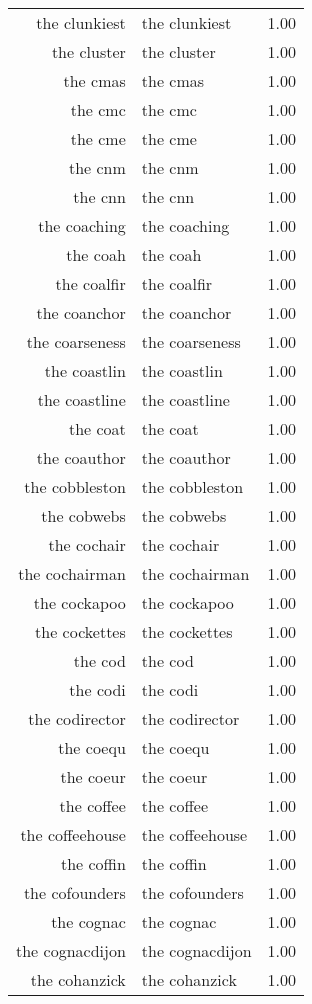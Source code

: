 \begin{table}[ht]
\begin{tabular}{rlr}
  the clunkiest & the clunkiest & 1.00 \\ 
  the cluster & the cluster & 1.00 \\ 
  the cmas & the cmas & 1.00 \\ 
  the cmc & the cmc & 1.00 \\ 
  the cme & the cme & 1.00 \\ 
  the cnm & the cnm & 1.00 \\ 
  the cnn & the cnn & 1.00 \\ 
  the coaching & the coaching & 1.00 \\ 
  the coah & the coah & 1.00 \\ 
  the coalfir & the coalfir & 1.00 \\ 
  the coanchor & the coanchor & 1.00 \\ 
  the coarseness & the coarseness & 1.00 \\ 
  the coastlin & the coastlin & 1.00 \\ 
  the coastline & the coastline & 1.00 \\ 
  the coat & the coat & 1.00 \\ 
  the coauthor & the coauthor & 1.00 \\ 
  the cobbleston & the cobbleston & 1.00 \\ 
  the cobwebs & the cobwebs & 1.00 \\ 
  the cochair & the cochair & 1.00 \\ 
  the cochairman & the cochairman & 1.00 \\ 
  the cockapoo & the cockapoo & 1.00 \\ 
  the cockettes & the cockettes & 1.00 \\ 
  the cod & the cod & 1.00 \\ 
  the codi & the codi & 1.00 \\ 
  the codirector & the codirector & 1.00 \\ 
  the coequ & the coequ & 1.00 \\ 
  the coeur & the coeur & 1.00 \\ 
  the coffee & the coffee & 1.00 \\ 
  the coffeehouse & the coffeehouse & 1.00 \\ 
  the coffin & the coffin & 1.00 \\ 
  the cofounders & the cofounders & 1.00 \\ 
  the cognac & the cognac & 1.00 \\ 
  the cognacdijon & the cognacdijon & 1.00 \\ 
  the cohanzick & the cohanzick & 1.00 \\ 

\end{tabular}
\end{table}
